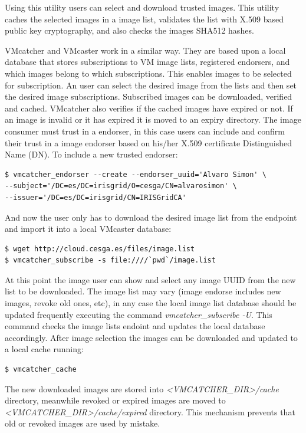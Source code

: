 \documentclass{cai}
\begin{document}
Using this utility users can select and download trusted images.
This utility caches the selected images in a image list, validates the list with X.509 based public key cryptography, and also checks the images SHA512 hashes. 

VMcatcher and VMcaster work in a similar way. They are based upon a local database that stores subscriptions to VM image lists, registered endorsers, and which images belong to which subscriptions. 
This enables images to be selected for subscription. An user can select the desired image from the lists and then set the desired image subscriptions.
Subscribed images can be downloaded, verified and cached. VMcatcher also verifies if the cached images have expired or not. If an image is invalid or it has expired it is moved to an expiry directory.
The image consumer must trust in a endorser, in this case users can include and confirm their trust in a image endorser based on his/her X.509 certificate Distinguished Name (DN).
To include a new trusted endorser:
\begin{verbatim}
$ vmcatcher_endorser --create --endorser_uuid='Alvaro Simon' \
--subject='/DC=es/DC=irisgrid/O=cesga/CN=alvarosimon' \
--issuer='/DC=es/DC=irisgrid/CN=IRISGridCA'
\end{verbatim}
And now the user only has to download the desired image list from the endpoint and import it into a local VMcaster database:
\begin{verbatim}
$ wget http://cloud.cesga.es/files/image.list
$ vmcatcher_subscribe -s file:////`pwd`/image.list
\end{verbatim}
At this point the image user can show and select any image UUID from the new list to be downloaded. 
The image list may vary (image endorse includes new images, revoke old ones, etc), in any case the local image list database should be updated frequently executing the command \textit{vmcatcher\_subscribe -U}.
This command checks the image lists endoint and updates the local database accordingly.
After image selection the images can be downloaded and updated to a local cache running:
\begin{verbatim}
$ vmcatcher_cache
\end{verbatim}

The new downloaded images are stored into \textit{<VMCATCHER\_DIR>\-/cache} directory, meanwhile revoked or expired images are moved to \textit{<VMCATCHER\_DIR>\-/cache\-/expired} directory. 
This mechanism prevents that old or revoked images are used by mistake.  
\end{document}
